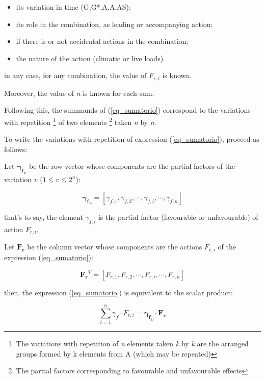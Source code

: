 \begin{itemize}
\item its variation in time (G,G*,A,A,AS);
\item its role in the combination, as leading or accompanying action;
\item if there is or not accidental actions in the combination;
\item the nature of the action (climatic or live loads).
\end{itemize}

\noindent in any case, for any combination, the value of $F_{r,i}$ is known.

Moreover, the value of \emph{n} is known for each sum.

Following this, the summands of (\ref{eq_sumatorio}) correspond to the variations with repetition \footnote{The variations with repetition of \emph{n} elements taken \emph{k} by \emph{k} are the arranged groups formed by k elements from A (which may be repeated)} of two elements 
\footnote{The partial factors corresponding to favourable and unfavourable effects} taken \emph{n} by \emph{n}.

To write the variations with repetition of expression (\ref{eq_sumatorio}), proceed as follows:

Let $\mathbf{\gamma_f}_v$ be the row vector whose components are the partial factors of the variation $v$ ($1 \leq v \leq 2^n$):

\begin{equation}
\mathbf{\gamma_f}_v= [\gamma_{f,1}, \gamma_{f,2}, \cdots, \gamma_{f,i}, \cdots, \gamma_{f,n}]
\end{equation}

\noindent that's to say, the element $\gamma_{f,i}$ is the partial factor (favourable or unfavourable) of action $F_{r,i}$.

Let $\mathbf{F_r}$ be the column vector whose components are the actions $F_{r,i}$ of the expression (\ref{eq_sumatorio}):

\begin{equation}
\mathbf{F_r}^T= [F_{r,1}, F_{r,2}, \cdots, F_{r,i}, \cdots, F_{r,n}]
\end{equation}

\noindent then, the expression (\ref{eq_sumatorio}) is equivalent to the scalar product:

\begin{equation}
\sum_{i=1}^n \gamma_f \cdot F_{r,i}= \mathbf{\gamma_f}_v \cdot \mathbf{F_r}
\end{equation}

